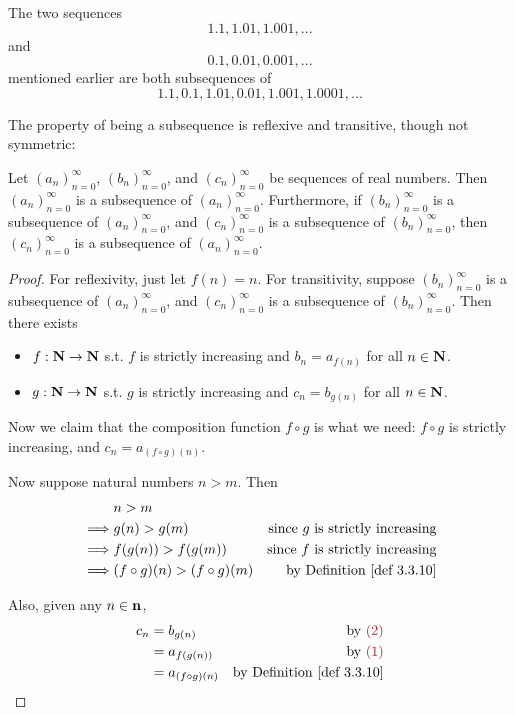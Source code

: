 \begin{example} \label{example 6.6.3}
The two sequences
\[
    1.1, 1.01, 1.001,...
\]
and
\[
    0.1, 0.01, 0.001,...
\]
mentioned earlier are both subsequences of
\[
    1.1, 0.1, 1.01, 0.01, 1.001, 1.0001,...
\]
\end{example}

The property of being a subsequence is reflexive and transitive, though not symmetric:
\begin{lemma} \label{lem 6.6.4}
Let \((a_n)_{n = 0}^{\infty}\), \((b_n)_{n = 0}^{\infty}\), and \((c_n)_{n = 0}^{\infty}\) be sequences of real numbers.
Then \((a_n)_{n = 0}^{\infty}\) is a subsequence of \((a_n)_{n = 0}^{\infty}\).
Furthermore, if \((b_n)_{n = 0}^{\infty}\) is a subsequence of \((a_n)_{n = 0}^{\infty}\), and \((c_n)_{n = 0}^{\infty}\) is a subsequence of \((b_n)_{n = 0}^{\infty}\),
then \((c_n)_{n = 0}^{\infty}\) is a subsequence of \((a_n)_{n = 0}^{\infty}\).
\end{lemma}

\begin{proof}
For reflexivity, just let \(f(n) = n\).
For transitivity, suppose \((b_n)_{n = 0}^{\infty}\) is a subsequence of \((a_n)_{n = 0}^{\infty}\), and \((c_n)_{n = 0}^{\infty}\) is a subsequence of \((b_n)_{n = 0}^{\infty}\).
Then there exists
\begin{itemize}
    \item[\MAROON{(1)}] \(f : \mathbf{N} \rightarrow \mathbf{N}\) s.t. \(f\) is strictly increasing and \(b_n = a_{f(n)}\) for all \(n \in \mathbf{N}\).
    \item[\MAROON{(2)}] \(g : \mathbf{N} \rightarrow \mathbf{N}\) s.t. \(g\) is strictly increasing and \(c_n = b_{g(n)}\) for all \(n \in \mathbf{N}\).
\end{itemize}

Now we claim that the composition function \(f \circ g\) is what we need: \(f \circ g\) is strictly increasing, and \(c_n = a_{(f \circ g)(n)}\).

Now suppose natural numbers \(n > m\).
Then
\begin{align*}
             & n > m \\
    \implies & g(n) > g(m) & \text{since \(g\) is strictly increasing} \\
    \implies & f(g(n)) > f(g(m)) & \text{since \(f\) is strictly increasing} \\
    \implies & (f \circ g)(n) > (f \circ g)(m) & \text{by \DEF{3.3.10}}
\end{align*}

Also, given any \(n \in \mathbf{n}\),
\begin{align*}
    c_n & = b_{g(n)} & \text{by \MAROON{(2)}} \\
        & = a_{f(g(n))} & \text{by \MAROON{(1)}} \\
        & = a_{(f \circ g)(n)} & \text{by \DEF{3.3.10}}
\end{align*}
\end{proof}

